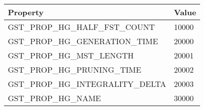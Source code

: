 \begin{tabular}{|l|l|}
\hline
Property & Value \\
\hline
GST\_PROP\_HG\_HALF\_FST\_COUNT & 10000 \\
GST\_PROP\_HG\_GENERATION\_TIME & 20000 \\
GST\_PROP\_HG\_MST\_LENGTH & 20001 \\
GST\_PROP\_HG\_PRUNING\_TIME & 20002 \\
GST\_PROP\_HG\_INTEGRALITY\_DELTA & 20003 \\
GST\_PROP\_HG\_NAME & 30000 \\
\hline
\end{tabular}
